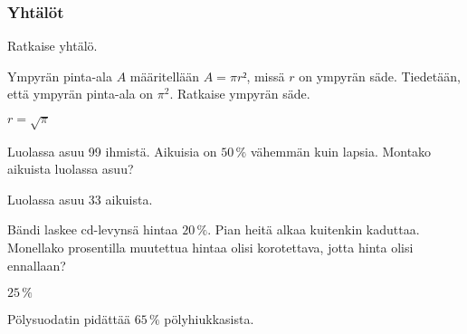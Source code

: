 \subsubsection*{Yhtälöt}

	\begin{tehtava}
	Ratkaise yhtälö.
	

\begin{vastaus}
\end{vastaus}
\end{tehtava}

\begin{tehtava}
	Ympyrän pinta-ala $A$ määritellään $A=\pi r²$, missä $r$ on ympyrän säde. Tiedetään, että ympyrän pinta-ala on $\pi^{2}$. Ratkaise ympyrän säde.
	

\begin{vastaus}
	{$r=\sqrt{\pi}$}
\end{vastaus}
\end{tehtava}


\begin{tehtava} 
		Luolassa asuu 99 ihmistä. Aikuisia on $50\,\%$ vähemmän kuin lapsia. Montako aikuista luolassa asuu?
\begin{vastaus}
	Luolassa asuu 33 aikuista.
\end{vastaus}
\end{tehtava}

\begin{tehtava}
	Bändi laskee cd-levynsä hintaa $20\,\%$. Pian heitä alkaa kuitenkin kaduttaa. Monellako prosentilla muutettua hintaa 
	olisi korotettava, jotta hinta olisi ennallaan?
		\begin{vastaus}
		 $25\,\%$
		\end{vastaus}
\end{tehtava}


\begin{tehtava}
	Pölysuodatin pidättää $65\,\%$ pölyhiukkasista.
\begin{vastaus}

\end{vastaus}
\end{tehtava}

